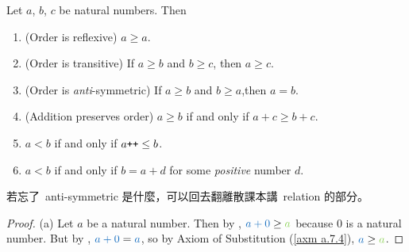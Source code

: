 \begin{proposition}  \label{prop 2.2.12}
Let \(a\), \(b\), \(c\) be natural numbers. Then
    \begin{enumerate}
        \item (Order is reflexive) \(a \geq a\).
        \item (Order is transitive) If \(a \geq b\) and \(b \geq c\), then \(a \geq c\).
        \item (Order is \emph{anti}-symmetric) If \(a \geq b\) and \(b \geq a\),then \(a = b\). 
        \item (Addition preserves order) \(a \geq b\) if and only if \(a + c \geq b + c\). 
        \item \(a < b\) if and only if \(a\texttt{++} \leq b\).
        \item \(a < b\) if and only if \(b = a + d\) for some \emph{positive} number \(d\).
    \end{enumerate}
\end{proposition}
\begin{note}
若忘了\ anti-symmetric 是什麼，可以回去翻離散課本講\ relation 的部分。
\end{note}
\begin{proof}{(a)}
Let \(a\) be a natural number. Then by , \(\BLUE{a + 0} \geq \GREEN{a}\) because \(0\) is a natural number. But by , \(\BLUE{a + 0} = \BLUE{a}\), so by Axiom of Substitution (\ref{axm a.7.4}), \(\BLUE{a} \geq \GREEN{a}\).
\end{proof}

